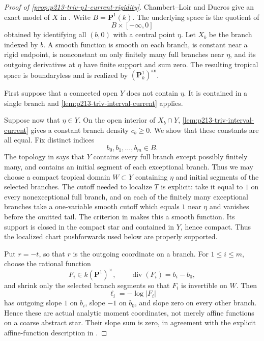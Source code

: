 \begin{proof}[Proof of \cref{prop:p213-triv-p1-current-rigidity}]
Chambert--Loir and Ducros give an exact model of \(X\) in
\cite[\S6.7.3]{CLD25}.  Write \(B=\mathbf P^1(k)\).  The underlying space is
the quotient of
\[
 B\times[-\infty,0]
\]
obtained by identifying all \((b,0)\) with a central point \(\eta\).  Let
\(X_b\) be the branch indexed by \(b\).  A smooth function is smooth on
each branch, is constant near a rigid endpoint, is nonconstant on only
finitely many full branches near \(\eta\), and its outgoing derivatives at
\(\eta\) have finite support and sum zero.  The resulting tropical space is
boundaryless and is realized by
\((\mathbf P^1_k)^{\mathrm{an}}\).

First suppose that a connected open \(Y\) does not contain \(\eta\).  It is
contained in a single branch and
\cref{lem:p213-triv-interval-current} applies.

Suppose now that \(\eta\in Y\).  On the open interior of \(X_b\cap Y\),
\cref{lem:p213-triv-interval-current} gives a constant branch density
\(c_b\geq0\).  We show that these constants are all equal.  Fix distinct
indices
\[
                    b_0,b_1,\ldots,b_m\in B.
\]
The topology in \cite[\S6.7.3]{CLD25} says that \(Y\) contains every full
branch except possibly finitely many, and contains an initial segment of
each exceptional branch.  Thus we may choose a compact tropical domain
\(W\subset Y\) containing \(\eta\) and initial segments of the selected
branches.  The cutoff needed to localize \(T\) is explicit: take it equal to
\(1\) on every nonexceptional full branch, and on each of the finitely many
exceptional branches take a one-variable smooth cutoff which equals \(1\)
near \(\eta\) and vanishes before the omitted tail.  The criterion in
\cite[\S6.7.3]{CLD25} makes this a smooth function.  Its support is closed in
the compact star and contained in \(Y\), hence compact.  Thus the localized
chart pushforwards used below are properly supported.

Put \(r=-t\), so that \(r\) is the outgoing coordinate on a branch.  For
\(1\leq i\leq m\), choose the rational function
\[
                     F_i\in k(\mathbf P^1)^\times,
       \qquad        \operatorname{div}(F_i)=b_i-b_0,
\]
and shrink only the selected branch segments so that \(F_i\) is invertible
on \(W\).  Then
\[
                         \ell_i=-\log|F_i|
\]
has outgoing slope \(1\) on \(b_i\), slope \(-1\) on \(b_0\), and slope
zero on every other branch.  Hence these are actual analytic moment
coordinates, not merely affine functions on a coarse abstract star.  Their
slope sum is zero, in agreement with the explicit affine-function
description in \cite[\S6.7.3]{CLD25}.


\end{proof}
